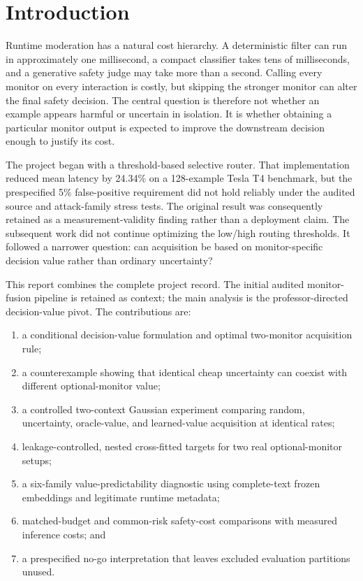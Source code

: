 \documentclass[11pt,a4paper]{article}
\begin{document}
\section{Introduction}

Runtime moderation has a natural cost hierarchy. A deterministic filter can run in approximately one millisecond, a compact classifier takes tens of milliseconds, and a generative safety judge may take more than a second. Calling every monitor on every interaction is costly, but skipping the stronger monitor can alter the final safety decision. The central question is therefore not whether an example appears harmful or uncertain in isolation. It is whether obtaining a particular monitor output is expected to improve the downstream decision enough to justify its cost.

The project began with a threshold-based selective router. That implementation reduced mean latency by 24.34\% on a 128-example Tesla T4 benchmark, but the prespecified 5\% false-positive requirement did not hold reliably under the audited source and attack-family stress tests. The original result was consequently retained as a measurement-validity finding rather than a deployment claim. The subsequent work did not continue optimizing the low/high routing thresholds. It followed a narrower question: can acquisition be based on monitor-specific decision value rather than ordinary uncertainty?

This report combines the complete project record. The initial audited monitor-fusion pipeline is retained as context; the main analysis is the professor-directed decision-value pivot. The contributions are:

\begin{enumerate}
  \item a conditional decision-value formulation and optimal two-monitor acquisition rule;
  \item a counterexample showing that identical cheap uncertainty can coexist with different optional-monitor value;
  \item a controlled two-context Gaussian experiment comparing random, uncertainty, oracle-value, and learned-value acquisition at identical rates;
  \item leakage-controlled, nested cross-fitted targets for two real optional-monitor setups;
  \item a six-family value-predictability diagnostic using complete-text frozen embeddings and legitimate runtime metadata;
  \item matched-budget and common-risk safety-cost comparisons with measured inference costs; and
  \item a prespecified no-go interpretation that leaves excluded evaluation partitions unused.
\end{enumerate}
\end{document}
